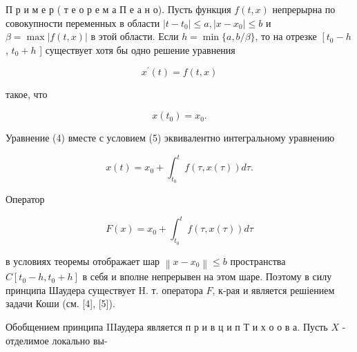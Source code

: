 \documentclass[10pt]{article}
\begin{document}
П р и м е р ( т е о р е м а П е а н о). Пусть функция $f(t, x)$ непрерырна по совокупности переменных в области $\left|t-t_{0}\right| \leqslant a,\left|x-x_{0}\right| \leqslant b$ и $\beta=\max |f(t, x)|$ в этой области. Если $h=\min \{a, b / \beta\}$, то на отрезке $\left[t_{0}-h\right.$, $t_{0}+h$ ] существует хотя бы одно решение уравнения



\[

x^{\prime}(t)=f(t, x)

\]



такое, что



\[

x\left(t_{0}\right)=x_{0} .

\]



Уравнение (4) вместе с условием (5) эквивалентно интегральному уравнению



\[

x(t)=x_{0}+\int_{t_{0}}^{t} f(\tau, x(\tau)) d \tau .

\]



Оператор



\[

F(x)=x_{0}+\int_{t_{0}}^{t} f(\tau, x(\tau)) d \tau

\]



в условиях теоремы отображает шар $\left\|x-x_{0}\right\| \leqslant b$ пространства $C\left[t_{0}-h, t_{0}+h\right]$ в себя и вполне непрерывен на этом шаре. Поэтому в силу принципа Шаудера существует H. т. оператора $F$, к-рая и является решіением задачи Коши (см. [4], [5]).



Обобщением принципа IIIаудера является п р и в ц и п Т и х о о в а. Пусть $X$ - отделимое локально вы-
\end{document}
